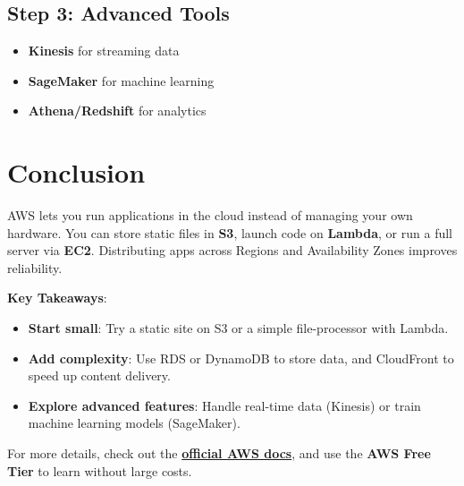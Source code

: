 \documentclass[12pt]{article}
\begin{document}
\subsection{Step 3: Advanced Tools}
\begin{itemize}
    \item \textbf{Kinesis} for streaming data
    \item \textbf{SageMaker} for machine learning
    \item \textbf{Athena/Redshift} for analytics
\end{itemize}

\begin{center}
\end{center}

\clearpage

\section*{Conclusion}
\justifying

AWS lets you run applications in the cloud instead of managing your own hardware. You can store static files in \textbf{S3}, launch code on \textbf{Lambda}, or run a full server via \textbf{EC2}. Distributing apps across Regions and Availability Zones improves reliability.

\textbf{Key Takeaways}:
\begin{itemize}
    \item \textbf{Start small}: Try a static site on S3 or a simple file-processor with Lambda.
    \item \textbf{Add complexity}: Use RDS or DynamoDB to store data, and CloudFront to speed up content delivery.
    \item \textbf{Explore advanced features}: Handle real-time data (Kinesis) or train machine learning models (SageMaker).
\end{itemize}

For more details, check out the
\href{https://aws.amazon.com/documentation/}{\textbf{official AWS docs}},
and use the \textbf{AWS Free Tier} to learn without large costs.
\end{document}
